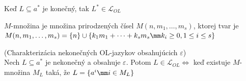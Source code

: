 \begin{poznamka}
Keď $L\subseteq a^{*}$ je konečný, tak $L^{*}\in\mathcal{L}_{OL}$
\end{poznamka}

\begin{definicia}
$M$-množina je množina prirodzených čísel
$M(n,m_{1},\dots,m_{s})$, ktorej tvar je
\mbox{$M(n,m_{1},\dots,m_{s})=\{n\}\cup\{k_{1}m_{1}
+\dots+k_{s}m_{s}\mm k_{i}\geq0,1\leq i\leq s\}$}
\end{definicia}

\begin{veta}
\label{nekon_ol} (Charakterizácia nekonečných OL-jazykov
obsahujúcich $\varepsilon$)
\\ Nech $L\subseteq a^{*}$ je
ne\-ko\-neč\-ný a obsahuje $\varepsilon$. Potom
$L\in\mathcal{L}_{OL}\Longleftrightarrow$ keď existuje $M$-množina
$M_{L}$ taká, že $L=\{a^{i}\mm i\in M_{L}\}$
\end{veta}

